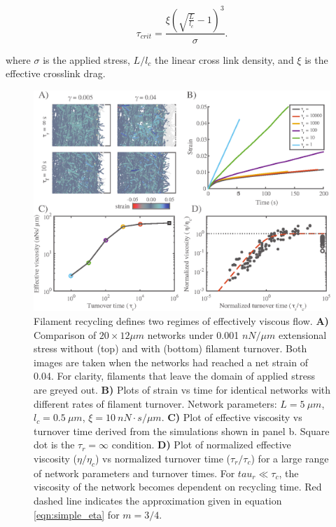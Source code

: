 \begin{equation}
	\label{eqn:syst3}
	\tau_{crit} = \frac{\xi {\left (\sqrt{\frac{L}{l_c}}-1 \right )}^3}{\sigma}.
\end{equation}

where  $\sigma$ is the applied stress, $L/l_c$ the linear cross link density, and $\xi$ is the effective crosslink drag. 


\begin{figure}[H]
	\centering
	\includegraphics[width=\hsize]{active/figures/Fig4}
	\caption{\label{fig:passive_rec}  Filament recycling defines two regimes of effectively viscous flow. \textbf{A)} Comparison of $20 \times 12 \mu m$ networks under 0.001 $nN/\mu m$ extensional stress without (top) and with (bottom) filament turnover.  Both images are taken when the networks had reached a net strain of 0.04.  For clarity, filaments that leave the domain of applied stress are greyed out. \textbf{B)} Plots of strain vs time for identical networks with different rates of filament turnover.  Network parameters: $L=5\: \mu m$, $l_c=0.5\: \mu m$, $\xi=10\: nN\cdot s/\mu m$. \textbf{C)}  Plot of effective viscosity vs turnover time derived from the simulations shown in panel b.  Square dot is the $\tau_r=\infty$ condition.  \textbf{D)} Plot of normalized effective viscosity ($\eta/\eta_c$) vs normalized turnover time ($\tau_r/\tau_c$) for a large range of network parameters and turnover times. For $tau_r \ll \tau_c$, the viscosity of the network becomes dependent on recycling time. Red dashed line indicates the approximation given in equation \ref{eqn:simple_eta} for $m=3/4$.}
\end{figure}

